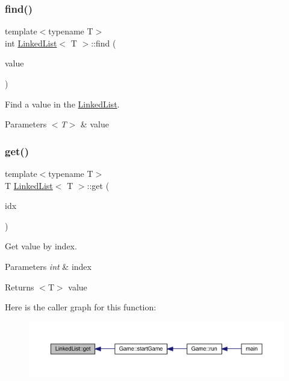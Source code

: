 \subsubsection{\texorpdfstring{find()}{find()}}
{\footnotesize\ttfamily template$<$typename T$>$ \\
int \mbox{\hyperlink{class_linked_list}{Linked\+List}}$<$ T $>$\+::find (\begin{DoxyParamCaption}\item[{T}]{value }\end{DoxyParamCaption})\hspace{0.3cm}{\ttfamily [inline]}}



Find a value in the \mbox{\hyperlink{class_linked_list}{Linked\+List}}. 


\begin{DoxyParams}{Parameters}
{\em $<$\+T$>$} & value \\
\hline
\end{DoxyParams}
\mbox{\label{class_linked_list_a5ca21e769005d1b3af2a2d2bb3313c98}} 
\subsubsection{\texorpdfstring{get()}{get()}}
{\footnotesize\ttfamily template$<$typename T$>$ \\
T \mbox{\hyperlink{class_linked_list}{Linked\+List}}$<$ T $>$\+::get (\begin{DoxyParamCaption}\item[{int}]{idx }\end{DoxyParamCaption})\hspace{0.3cm}{\ttfamily [inline]}}



Get value by index. 


\begin{DoxyParams}{Parameters}
{\em int} & index \\
\hline
\end{DoxyParams}
\begin{DoxyReturn}{Returns}
$<$\+T$>$ value 
\end{DoxyReturn}
Here is the caller graph for this function\+:\nopagebreak
\begin{figure}[H]
\begin{center}
\leavevmode
\includegraphics[width=350pt]{class_linked_list_a5ca21e769005d1b3af2a2d2bb3313c98_icgraph}
\end{center}
\end{figure}
\mbox{\label{class_linked_list_aa4614ce35a543b74afb3c5bff8b018d4}} 
